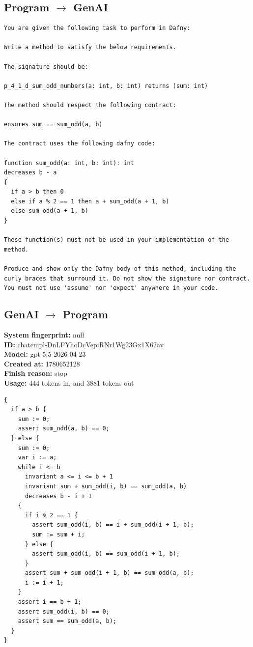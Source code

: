 \documentclass{article}
\begin{document}
\subsection*{Program $\rightarrow$ GenAI}
\begin{lstlisting}
You are given the following task to perform in Dafny:

Write a method to satisfy the below requirements.

The signature should be:

p_4_1_d_sum_odd_numbers(a: int, b: int) returns (sum: int)

The method should respect the following contract:

ensures sum == sum_odd(a, b)

The contract uses the following dafny code:

function sum_odd(a: int, b: int): int
decreases b - a
{
  if a > b then 0
  else if a % 2 == 1 then a + sum_odd(a + 1, b)
  else sum_odd(a + 1, b)
}

These function(s) must not be used in your implementation of the method.

Produce and show only the Dafny body of this method, including the curly braces that surround it. Do not show the signature nor contract. You must not use 'assume' nor 'expect' anywhere in your code.
\end{lstlisting}
\subsection*{GenAI $\rightarrow$ Program}
\textbf{System fingerprint: }null
\\\textbf{ID: }chatcmpl-DnLFYhoDcVepiRNr1Wg23Gx1X62av
\\\textbf{Model: }gpt-5.5-2026-04-23
\\\textbf{Created at: }1780652128
\\\textbf{Finish reason: }stop
\\\textbf{Usage: }444 tokens in, and 3881 tokens out
\begin{lstlisting}
{
  if a > b {
    sum := 0;
    assert sum_odd(a, b) == 0;
  } else {
    sum := 0;
    var i := a;
    while i <= b
      invariant a <= i <= b + 1
      invariant sum + sum_odd(i, b) == sum_odd(a, b)
      decreases b - i + 1
    {
      if i % 2 == 1 {
        assert sum_odd(i, b) == i + sum_odd(i + 1, b);
        sum := sum + i;
      } else {
        assert sum_odd(i, b) == sum_odd(i + 1, b);
      }
      assert sum + sum_odd(i + 1, b) == sum_odd(a, b);
      i := i + 1;
    }
    assert i == b + 1;
    assert sum_odd(i, b) == 0;
    assert sum == sum_odd(a, b);
  }
}
\end{lstlisting}
\end{document}
